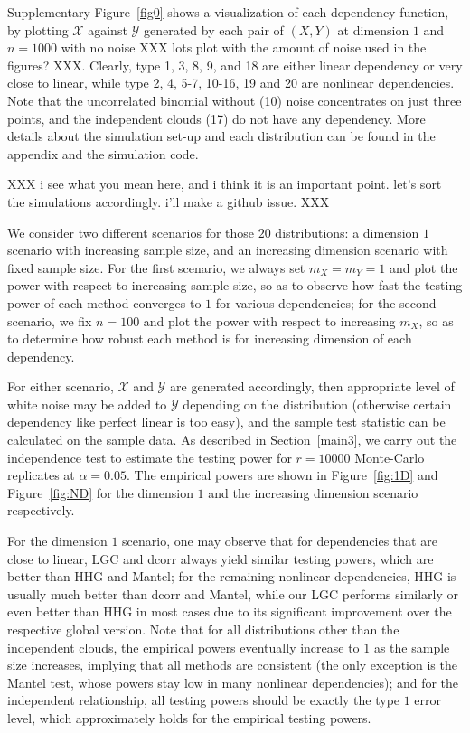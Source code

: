 \documentclass[11pt]{article}
\begin{document}
Supplementary Figure~\ref{fig0} shows a visualization of each dependency function, by plotting $\mathcal{X}$ against $\mathcal{Y}$ generated by each pair of $(X,Y)$ at dimension $1$ and $n=1000$ with no noise XXX lots plot with the amount of noise used in the figures? XXX. Clearly, type 1, 3, 8, 9, and 18 are either linear dependency or very close to linear, while type 2, 4, 5-7, 10-16, 19 and 20 are nonlinear dependencies. Note that the uncorrelated binomial without (10) noise concentrates on just three points, and the independent clouds (17) do not have any dependency. More details about the simulation set-up and each distribution can be found in the appendix and the simulation code.

XXX i see what you mean here, and i think it is an important point.  let's sort the simulations accordingly.  i'll make a github issue. XXX


We consider two different scenarios for those $20$ distributions: a dimension $1$ scenario with increasing sample size, and an increasing dimension scenario with fixed sample size. For the first scenario, we always set $m_{X}=m_{Y}=1$ and plot the power with respect to increasing sample size, so as to observe how fast the testing power of each method converges to $1$ for various dependencies; for the second scenario, we fix $n=100$ and plot the power with respect to increasing $m_{X}$, so as to determine how robust each method is for increasing dimension of each dependency. 

For either scenario, $\mathcal{X}$ and $\mathcal{Y}$ are generated accordingly, then appropriate level of white noise may be added to $\mathcal{Y}$ depending on the distribution (otherwise certain dependency like perfect linear is too easy), and the sample test statistic can be calculated on the sample data. As described in Section~\ref{main3}, we carry out the independence test to estimate the testing power for $r=10000$ Monte-Carlo replicates at $\alpha=0.05$. The empirical powers are shown in Figure~\ref{fig:1D} and Figure~\ref{fig:ND} for the dimension $1$ and the increasing dimension scenario respectively. 

For the dimension $1$ scenario, one may observe that for dependencies that are close to linear, LGC and dcorr always yield similar testing powers, which are better than HHG and Mantel; for the remaining nonlinear dependencies, HHG is usually much better than dcorr and Mantel, while our LGC performs similarly or even better than HHG in most cases due to its significant improvement over the respective global version. Note that for all distributions other than the independent clouds, the empirical powers eventually increase to $1$ as the sample size increases, implying that all methods are consistent (the only exception is the Mantel test, whose powers stay low in many nonlinear dependencies); and for the independent relationship, all testing powers should be exactly the type $1$ error level, which approximately holds for the empirical testing powers. 
\end{document}
